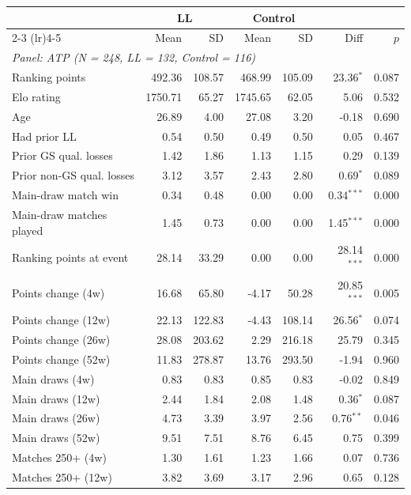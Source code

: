 \begin{tabular}{l rr rr rr}
\toprule
 & \multicolumn{2}{c}{LL} & \multicolumn{2}{c}{Control} & & \\
\cmidrule(lr){2-3} \cmidrule(lr){4-5}
 & Mean & SD & Mean & SD & Diff & $p$ \\
\midrule
\multicolumn{7}{l}{\textit{Panel: ATP (N = 248, LL = 132, Control = 116)}} \\
\addlinespace
\quad Ranking points & 492.36 & 108.57 & 468.99 & 105.09 & 23.36$^{*}$ & 0.087 \\
\quad Elo rating & 1750.71 & 65.27 & 1745.65 & 62.05 & 5.06 & 0.532 \\
\quad Age & 26.89 & 4.00 & 27.08 & 3.20 & -0.18 & 0.690 \\
\quad Had prior LL & 0.54 & 0.50 & 0.49 & 0.50 & 0.05 & 0.467 \\
\quad Prior GS qual. losses & 1.42 & 1.86 & 1.13 & 1.15 & 0.29 & 0.139 \\
\quad Prior non-GS qual. losses & 3.12 & 3.57 & 2.43 & 2.80 & 0.69$^{*}$ & 0.089 \\
\quad Main-draw match win & 0.34 & 0.48 & 0.00 & 0.00 & 0.34$^{***}$ & 0.000 \\
\quad Main-draw matches played & 1.45 & 0.73 & 0.00 & 0.00 & 1.45$^{***}$ & 0.000 \\
\quad Ranking points at event & 28.14 & 33.29 & 0.00 & 0.00 & 28.14$^{***}$ & 0.000 \\
\quad Points change (4w) & 16.68 & 65.80 & -4.17 & 50.28 & 20.85$^{***}$ & 0.005 \\
\quad Points change (12w) & 22.13 & 122.83 & -4.43 & 108.14 & 26.56$^{*}$ & 0.074 \\
\quad Points change (26w) & 28.08 & 203.62 & 2.29 & 216.18 & 25.79 & 0.345 \\
\quad Points change (52w) & 11.83 & 278.87 & 13.76 & 293.50 & -1.94 & 0.960 \\
\quad Main draws (4w) & 0.83 & 0.83 & 0.85 & 0.83 & -0.02 & 0.849 \\
\quad Main draws (12w) & 2.44 & 1.84 & 2.08 & 1.48 & 0.36$^{*}$ & 0.087 \\
\quad Main draws (26w) & 4.73 & 3.39 & 3.97 & 2.56 & 0.76$^{**}$ & 0.046 \\
\quad Main draws (52w) & 9.51 & 7.51 & 8.76 & 6.45 & 0.75 & 0.399 \\
\quad Matches 250+ (4w) & 1.30 & 1.61 & 1.23 & 1.66 & 0.07 & 0.736 \\
\quad Matches 250+ (12w) & 3.82 & 3.69 & 3.17 & 2.96 & 0.65 & 0.128 \\

\end{tabular}
